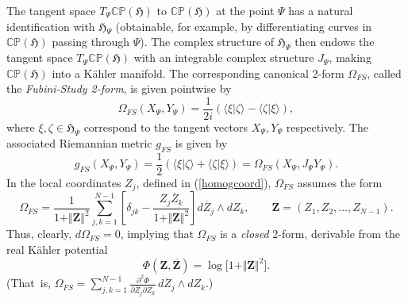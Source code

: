 \documentclass[12pt]{amsart}
\numberwithin{equation}{section}
\theoremstyle{remark}
\newcommand\HH{\mathfrak H}
\newcommand{\prhs}{{\mathbb C\mathbb P}( \HH)}
\begin{document}
The tangent space $T_\Psi\prhs $ to $\prhs$ at the point $\Psi$ has a natural
identification  with $\HH_\Psi$ (obtainable, for example,  by differentiating
curves in $\prhs$ passing  through $\Psi$).
The complex structure of $\HH_\Psi$ then endows the tangent space $T_\Psi\prhs$
with an  integrable complex  structure $J_{\Psi}$, making $\prhs$ into a
K\"ahler manifold. The corresponding  canonical 2-form $\Omega_{FS}$, called
the {\em Fubini-Study 2-form}, is given pointwise by
\begin{equation}
 \Omega_{FS}(X_\Psi, Y_\Psi) =
 \frac{1}{2i} ( \langle \xi \vert \zeta \rangle - \langle
 \zeta\vert \xi \rangle),
\end{equation}
where $  \xi , \zeta  \in \HH_\Psi$  correspond to the tangent vectors $X_\Psi,
Y_\Psi$ respectively. The associated Riemannian metric $g_{FS}$ is given by
\begin{equation}
g_{FS}(X_\Psi, Y_\Psi) = \frac{1}{2} ( \langle \xi \vert \zeta \rangle +
\langle \zeta \vert \xi \rangle) =  \Omega_{FS}(X_\Psi, J_{\Psi}Y_\Psi) .
\end{equation}
In the local coordinates $Z_{j}$, defined in (\ref{homogcoord}), $\Omega_{FS}$
assumes the form
\begin{equation}
\Omega_{FS} = \frac{1}{1+ \Vert{\mathbf Z}\Vert^{2}}\sum_{j,k = 1}^{N-1}
\left[ \delta_{jk} - \frac{Z_{j}\overline{Z}_{k}}
                 {1+ \Vert{\mathbf Z}\Vert^{2}}\right]
d\overline{Z}_{j}\wedge dZ_{k}, \qquad {\mathbf Z}
                  = (Z_{1}, Z_{2}, \ldots , Z_{N-1}).
\end{equation}
Thus, clearly, $d\Omega_{FS} = 0$, implying that $\Omega_{FS}$ is a {\it
closed} 2-form, derivable from the  real K\"ahler potential
\begin{equation}
   \Phi({\mathbf Z}, \overline{\mathbf Z})
   = \log{\lbrack 1+ \Vert{\mathbf Z}\Vert^{2}\rbrack}.
\end{equation}
(That~is, $\Omega_{FS}=\displaystyle\sum_{j,k=1}^{N-1} \frac{\partial^2\Phi}
{\partial \overline Z_j \partial Z_k} \, d\overline Z_j \wedge d Z_k.$)
\end{document}

